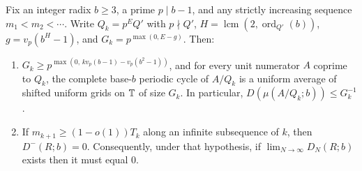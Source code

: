 \documentclass[11pt]{article}
\DeclareMathOperator{\ord}{ord}
\DeclareMathOperator{\lcm}{lcm}
\begin{document}
\begin{proposition}\label{prop:prime-grids}
Fix an integer radix $b\ge3$, a prime $p\mid b-1$, and any strictly increasing sequence $m_1<m_2<\cdots$. Write $Q_k=p^E Q'$ with $p\nmid Q'$, $H=\lcm(2,\ord_{Q'}(b))$, $g=v_p(b^H-1)$, and $G_k=p^{\max(0,E-g)}$. Then:
\begin{enumerate}[label=\textup{(\alph*)},nosep]
\item $G_k\ge p^{\max(0,\,k v_p(b-1)-v_p(b^2-1))}$, and for every unit numerator $A$ coprime to $Q_k$, the complete base-$b$ periodic cycle of $A/Q_k$ is a uniform average of shifted uniform grids on $\mathbb T$ of size $G_k$. In particular, $D(\mu(A/Q_k;b))\le G_k^{-1}$.
\item If $m_{k+1}\ge(1-o(1))T_k$ along an infinite subsequence of $k$, then $D^-(R;b)=0$. Consequently, under that hypothesis, if $\lim_{N\to\infty}D_N(R;b)$ exists then it must equal $0$.
\end{enumerate}
\end{proposition}
\end{document}
